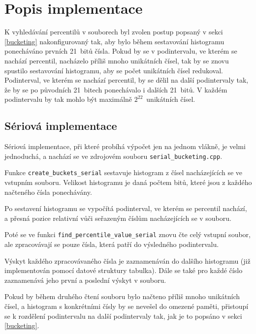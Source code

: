 \documentclass[12pt, a4paper]{article}
\newcommand{\bucketingparamone}{21}
\newcommand{\bucketingparamtwo}{21}
\newcommand{\bucketingparamthree}{22}
\let\oldsection\section
\renewcommand\section{\clearpage\oldsection}
\begin{document}
\section{Popis implementace}

K vyhledávání percentilů v souborech byl zvolen postup popsaný v sekci \ref{bucketing} nakonfigurovaný tak, aby bylo během sestavování histogramu ponecháváno prvních \bucketingparamone~bitů čísla.
Pokud by se v podintervalu, ve kterém se nachází percentil, nacházelo příliš mnoho unikátních čísel, tak by se znovu spustilo sestavování histogramu, aby se počet unikátních čísel redukoval. 
Podinterval, ve kterém se nachází percentil, by se dělil na další podintervaly tak, že by se po původních \bucketingparamone~bitech ponechávalo i dalších \bucketingparamtwo~bitů. 
V každém podintervalu by tak mohlo být maximálně $2^{\bucketingparamthree}$~unikátních čísel.

\subsection{Sériová implementace}
Sériová implementace, při které probíhá výpočet jen na jednom vlákně, je velmi jednoduchá, a nachází se ve zdrojovém souboru \texttt{serial\_bucketing.cpp}.


Funkce \texttt{create\_buckets_serial} sestavuje histogram z čísel nacházejících se ve vstupním souboru.
Velikost histogramu je daná počtem bitů, které jsou z každého načteného čísla ponechávány.

Po sestavení histogramu se vypočítá podinterval, ve kterém se percentil nachází, a přesná pozice relativní vůči seřazeným číslům nacházejících se v souboru. 

Poté se ve funkci \texttt{find\_percentile\_value\_serial} znovu čte celý vstupní soubor, ale zpracovávají se pouze čísla, která patří do výsledného podintervalu.

Výskyt každého zpracovávaného čísla je zaznamenáván do dalšího histogramu (již implementován pomocí datové struktury tabulka). 
Dále se také pro každé číslo zaznamenává jeho první a poslední výskyt v souboru.

Pokud by během druhého čtení souboru bylo načteno příliš mnoho unikátních čísel, a histogram s konkrétními čísly by se nevešel do omezené paměti, přistoupí se k rozdělení podintervalu na další podintervaly tak, jak je to popsáno v sekci \ref{bucketing}.
\end{document}
